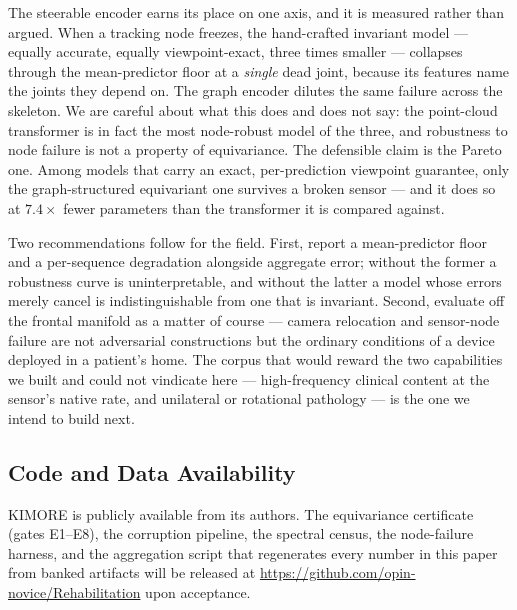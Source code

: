 \documentclass[10pt,journal]{IEEEtran}
\begin{document}
The steerable encoder earns its place on one axis, and it is measured rather than argued. When a tracking node freezes, the hand-crafted invariant model --- equally accurate, equally viewpoint-exact, three times smaller --- collapses through the mean-predictor floor at a \emph{single} dead joint, because its features name the joints they depend on. The graph encoder dilutes the same failure across the skeleton. We are careful about what this does and does not say: the point-cloud transformer is in fact the most node-robust model of the three, and robustness to node failure is not a property of equivariance. The defensible claim is the Pareto one. Among models that carry an exact, per-prediction viewpoint guarantee, only the graph-structured equivariant one survives a broken sensor --- and it does so at $7.4\times$ fewer parameters than the transformer it is compared against.

Two recommendations follow for the field. First, report a mean-predictor floor and a per-sequence degradation alongside aggregate error; without the former a robustness curve is uninterpretable, and without the latter a model whose errors merely cancel is indistinguishable from one that is invariant. Second, evaluate off the frontal manifold as a matter of course --- camera relocation and sensor-node failure are not adversarial constructions but the ordinary conditions of a device deployed in a patient's home. The corpus that would reward the two capabilities we built and could not vindicate here --- high-frequency clinical content at the sensor's native rate, and unilateral or rotational pathology --- is the one we intend to build next.

\subsection*{Code and Data Availability}
KIMORE \cite{capecci2019kimore} is publicly available from its authors. The equivariance certificate (gates E1--E8), the corruption pipeline, the spectral census, the node-failure harness, and the aggregation script that regenerates every number in this paper from banked artifacts will be released at \url{https://github.com/opin-novice/Rehabilitation} upon acceptance.
\end{document}
